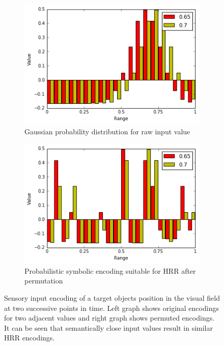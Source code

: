 \documentclass[journal]{journal}
\begin{document}
		\begin{figure}[th!]
			\begin{subfigure}{0.45\columnwidth}
				\center
				\includegraphics[width=1\columnwidth]{img/gaussianbar.png}
				\caption{Gaussian probability distribution for raw input value\\}
				\label{fig:gaussianbar}
			\end{subfigure}
			\begin{subfigure}{0.45\columnwidth}
				\center
				\includegraphics[width=1\columnwidth]{img/gaussianbarperm.png}
				\caption{Probabilistic symbolic encoding suitable for HRR after permutation
				}
				\label{fig:gaussianbarperm}
			\end{subfigure}	
		\caption{Sensory input encoding of a target objects position in the visual field at two successive points in time. Left graph shows original encodings for two adjacent values and right graph shows permuted encodings. It can be seen that semantically close input values result in similar HRR encodings.}
		\label{fig:gaussian}
		\end{figure}	
\end{document}
